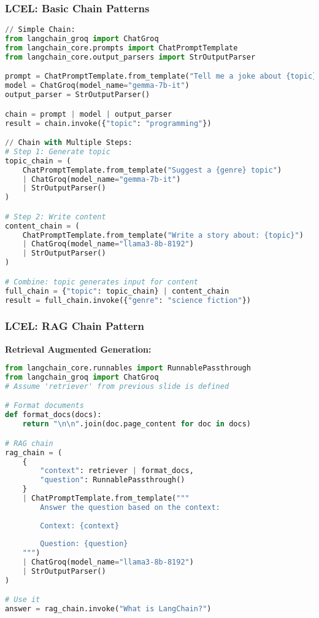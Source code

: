 \begin{frame}[fragile]\frametitle{LCEL: Basic Chain Patterns}


\begin{lstlisting}[language=python, basicstyle=\tiny]
// Simple Chain:
from langchain_groq import ChatGroq
from langchain_core.prompts import ChatPromptTemplate
from langchain_core.output_parsers import StrOutputParser

prompt = ChatPromptTemplate.from_template("Tell me a joke about {topic}")
model = ChatGroq(model_name="gemma-7b-it")
output_parser = StrOutputParser()

chain = prompt | model | output_parser
result = chain.invoke({"topic": "programming"})

// Chain with Multiple Steps:
# Step 1: Generate topic
topic_chain = (
    ChatPromptTemplate.from_template("Suggest a {genre} topic")
    | ChatGroq(model_name="gemma-7b-it")
    | StrOutputParser()
)

# Step 2: Write content
content_chain = (
    ChatPromptTemplate.from_template("Write a story about: {topic}")
    | ChatGroq(model_name="llama3-8b-8192")
    | StrOutputParser()
)

# Combine: topic generates input for content
full_chain = {"topic": topic_chain} | content_chain
result = full_chain.invoke({"genre": "science fiction"})
\end{lstlisting}

\end{frame}

\begin{frame}[fragile]\frametitle{LCEL: RAG Chain Pattern}

\textbf{Retrieval Augmented Generation:}
\begin{lstlisting}[language=python, basicstyle=\tiny]
from langchain_core.runnables import RunnablePassthrough
from langchain_groq import ChatGroq
# Assume 'retriever' from previous slide is defined

# Format documents
def format_docs(docs):
    return "\n\n".join(doc.page_content for doc in docs)

# RAG chain
rag_chain = (
    {
        "context": retriever | format_docs,
        "question": RunnablePassthrough()
    }
    | ChatPromptTemplate.from_template("""
        Answer the question based on the context:
        
        Context: {context}
        
        Question: {question}
    """)
    | ChatGroq(model_name="llama3-8b-8192")
    | StrOutputParser()
)

# Use it
answer = rag_chain.invoke("What is LangChain?")
\end{lstlisting}

\end{frame}

